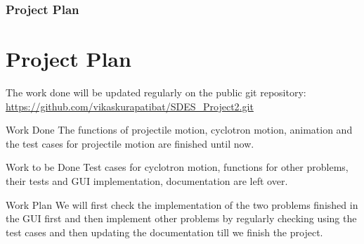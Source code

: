 \documentclass{beamer}
\begin{document}

\begin{frame}
\frametitle{Project Plan}
\section{Project Plan}
The work done will be updated regularly on the public git repository: \url{https://github.com/vikaskurapatibat/SDES_Project2.git}
\begin{block}{Work Done}
The functions of projectile motion, cyclotron motion, animation and the test cases for projectile motion are finished until now. 
\end{block}

\begin{block}{Work to be Done}
Test cases for cyclotron motion, functions for other problems, their tests and GUI implementation, documentation are left over.
\end{block}

\begin{block}{Work Plan}
We will first check the implementation of the two problems finished in the GUI first and then implement other problems by regularly checking using the test cases and then updating the documentation till we finish the project.
\end{block}
\end{frame}





\end{document}
